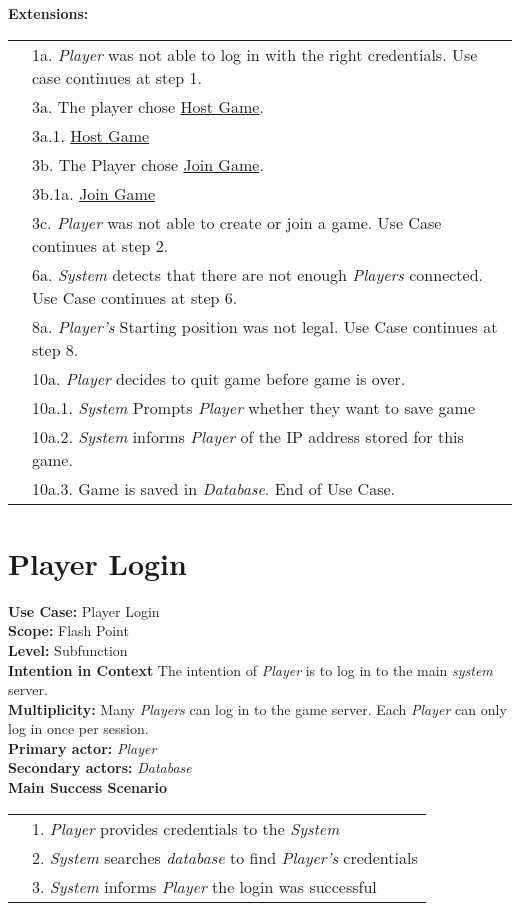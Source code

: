 \documentclass{article}
\begin{document}
	\textbf{Extensions:}\\
	\begin{tabular}{l l}
		&1a. \textit{Player} was not able to log in with the right credentials. Use case continues at step 1.\\
		&3a. The player chose \underline{Host Game}.\\
		&\qquad3a.1. \underline{Host Game}\\
		&3b. The Player chose \underline{Join Game}.\\
		&\qquad3b.1a. \underline{Join Game}\\
		&3c. \textit{Player} was not able to create or join a game. Use Case continues at step 2.\\
		&6a. \textit{System} detects that there are not enough \textit{Players} connected. Use Case continues at step 6.\\
		&8a. \textit{Player's} Starting position was not legal. Use Case continues at step 8.\\
		&10a. \textit{Player} decides to quit game before game is over.\\
		&\qquad 10a.1. \textit{System} Prompts \textit{Player} whether they want to save game\\
		&\qquad 10a.2. \textit{System} informs \textit{Player} of the IP address stored for this game.\\
		&\qquad 10a.3. Game is saved in \textit{Database}. End of Use Case.
	\end{tabular}
	\section*{Player Login}
	\textbf{Use Case:} Player Login\\
	\textbf{Scope:}
	Flash Point\\
	\textbf{Level:}
	Subfunction\\
	\textbf{Intention in Context}
	The intention of \textit{Player} is to log in to the main \textit{system} server.\\
	\textbf{Multiplicity:}
	Many \textit{Players} can log in to the game server. Each \textit{Player} can only log in once per session.\\
	\textbf{Primary actor: } \textit{Player}\\
	\textbf{Secondary actors:} \textit{Database}\\
	\textbf{Main Success Scenario}\\
	\begin{tabular}{l l}
		&1. \textit{Player} provides credentials to the \textit{System}\\
		&2. \textit{System} searches \textit{database} to find \textit{Player's} credentials\\
		&3. \textit{System} informs \textit{Player} the login was successful
	\end{tabular}
\end{document}
